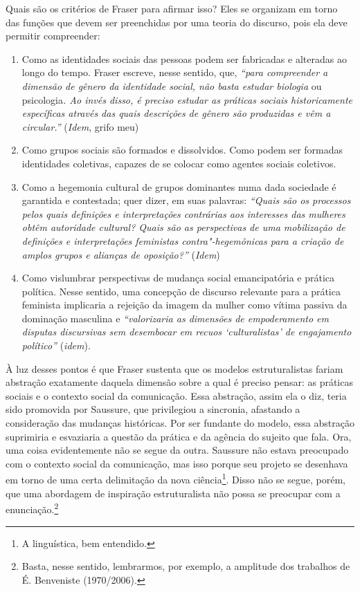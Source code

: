 Quais são os critérios de Fraser para afirmar isso? Eles se organizam em
torno das funções que devem ser preenchidas por uma teoria do discurso,
pois ela deve permitir compreender:

\begin{enumerate}
\def\labelenumi{\arabic{enumi})}
\item
Como as identidades sociais das pessoas podem ser fabricadas e
alteradas ao longo do tempo. Fraser escreve, nesse sentido, que,
\emph{``para compreender a dimensão de gênero da identidade social, não
basta estudar biologia} ou psicologia\emph{. Ao invés disso, é preciso
estudar as práticas sociais historicamente específicas através das quais
descrições de gênero são produzidas e vêm a circular.''} (\emph{Idem},
grifo meu)
\item
Como grupos sociais são formados e dissolvidos. Como podem ser
formadas identidades coletivas, capazes de se colocar como agentes
sociais coletivos.
\item
Como a hegemonia cultural de grupos dominantes numa dada sociedade é
garantida e contestada; quer dizer, em suas palavras: \emph{``Quais são
os processos pelos quais definições e interpretações contrárias aos
interesses das mulheres obtêm autoridade cultural? Quais são as
perspectivas de uma mobilização de definições e interpretações
feministas contra"-hegemônicas para a criação de amplos grupos e alianças
de oposição?''} (\emph{Idem})
\item
Como vislumbrar perspectivas de mudança social emancipatória e
prática política. Nesse sentido, uma concepção de discurso relevante
para a prática feminista implicaria a rejeição da imagem da mulher como
vítima passiva da dominação masculina e \emph{``valorizaria as dimensões
de empoderamento em disputas discursivas sem desembocar em recuos
`culturalistas' de engajamento político''} (\emph{idem}).
\end{enumerate}

À luz desses pontos é que Fraser sustenta que os modelos estruturalistas
fariam abstração exatamente daquela dimensão sobre a qual é preciso
pensar: as práticas sociais e o contexto social da comunicação. Essa
abstração, assim ela o diz, teria sido promovida por Saussure, que
privilegiou a sincronia, afastando a consideração das mudanças
históricas. Por ser fundante do modelo, essa abstração suprimiria e
esvaziaria a questão da prática e da agência do sujeito que fala. Ora,
uma coisa evidentemente não se segue da outra. Saussure não estava
preocupado com o contexto social da comunicação, mas isso porque seu
projeto se desenhava em torno de uma certa delimitação da nova
ciência\footnote{A linguística, bem entendido.}. Disso não se segue,
porém, que uma abordagem de inspiração estruturalista não possa se
preocupar com a enunciação.\footnote{Basta, nesse sentido, lembrarmos,
  por exemplo, a amplitude dos trabalhos de É. Benveniste (1970/2006).}

